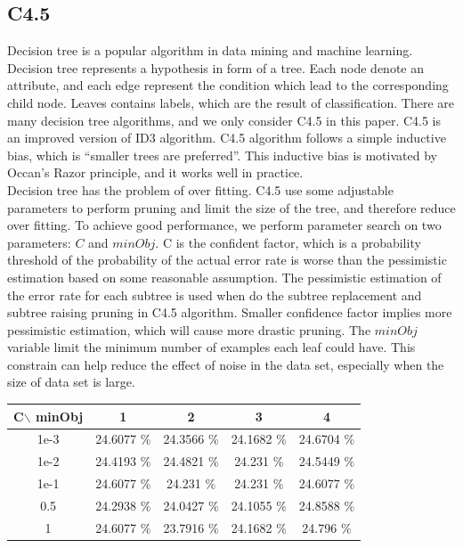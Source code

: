 \documentclass[a4paper,11pt]{article}
\begin{document}
\subsection{C4.5}
Decision tree is a popular algorithm in data mining and machine learning. Decision tree represents a hypothesis in form of a tree. Each node denote an attribute, and each edge represent the condition which lead to the corresponding child node. Leaves contains labels, which are the result of classification. There are many decision tree algorithms, and we only consider C4.5 in this paper. C4.5 is an improved version of ID3 algorithm. C4.5 algorithm follows a simple inductive bias, which is ``smaller trees are preferred''. This inductive bias is motivated by Occan's Razor principle, and it works well in practice.\\
Decision tree has the problem of over fitting. C4.5 use some adjustable parameters to perform pruning and limit the size of the tree, and therefore reduce over fitting. To achieve good performance, we perform parameter search on two parameters: $C$ and $minObj$. C is the confident factor, which is a probability threshold of the probability of the actual error rate is worse than the pessimistic estimation based on some reasonable assumption\cite{Morgan.Kaufmann}. The pessimistic estimation of the error rate for each subtree is used when do the subtree replacement and subtree raising pruning in C4.5 algorithm. Smaller confidence factor implies more pessimistic estimation, which will cause more drastic pruning. The $minObj$ variable limit the minimum number of examples each leaf could have. This constrain can help reduce the effect of noise in the data set, especially when the size of data set is large.
\vspace{0.5cm}\\
\begin{tabular}{c|c c c c}
C$\backslash$ minObj	&1		&2		&3		&4\\
\hline \hline
1e-3 	&24.6077 \%	&24.3566 \%	&24.1682 \%	 &24.6704 \%\\
1e-2	&24.4193 \%	 &24.4821 \%	&24.231  \%	 &24.5449 \%\\
1e-1	&24.6077 \%	&24.231  \%	&24.231  \%	 &24.6077 \%\\
0.5 &24.2938 \%     &24.0427 \% &24.1055 \%  &24.8588 \%\\
1	&24.6077 \%	&23.7916 \%	&24.1682 \%	 &24.796  \%\\
\end{tabular}
\vspace{0.5cm}\\
\end{document}
